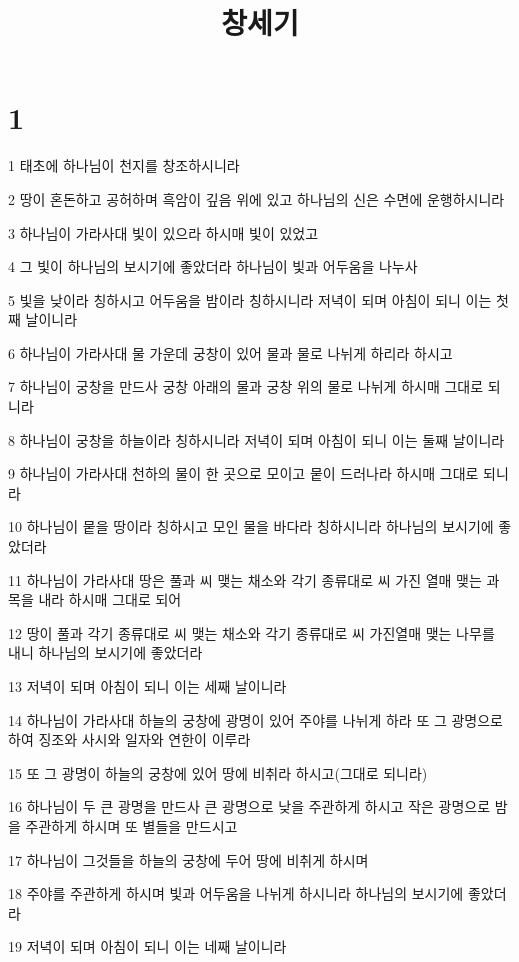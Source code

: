 

\title{창세기}


\chapter{1}

\par 1 태초에 하나님이 천지를 창조하시니라
\par 2 땅이 혼돈하고 공허하며 흑암이 깊음 위에 있고 하나님의 신은 수면에 운행하시니라
\par 3 하나님이 가라사대 빛이 있으라 하시매 빛이 있었고
\par 4 그 빛이 하나님의 보시기에 좋았더라 하나님이 빛과 어두움을 나누사
\par 5 빛을 낮이라 칭하시고 어두움을 밤이라 칭하시니라 저녁이 되며 아침이 되니 이는 첫째 날이니라
\par 6 하나님이 가라사대 물 가운데 궁창이 있어 물과 물로 나뉘게 하리라 하시고
\par 7 하나님이 궁창을 만드사 궁창 아래의 물과 궁창 위의 물로 나뉘게 하시매 그대로 되니라
\par 8 하나님이 궁창을 하늘이라 칭하시니라 저녁이 되며 아침이 되니 이는 둘째 날이니라
\par 9 하나님이 가라사대 천하의 물이 한 곳으로 모이고 뭍이 드러나라 하시매 그대로 되니라
\par 10 하나님이 뭍을 땅이라 칭하시고 모인 물을 바다라 칭하시니라 하나님의 보시기에 좋았더라
\par 11 하나님이 가라사대 땅은 풀과 씨 맺는 채소와 각기 종류대로 씨 가진 열매 맺는 과목을 내라 하시매 그대로 되어
\par 12 땅이 풀과 각기 종류대로 씨 맺는 채소와 각기 종류대로 씨 가진열매 맺는 나무를 내니 하나님의 보시기에 좋았더라
\par 13 저녁이 되며 아침이 되니 이는 세째 날이니라
\par 14 하나님이 가라사대 하늘의 궁창에 광명이 있어 주야를 나뉘게 하라 또 그 광명으로 하여 징조와 사시와 일자와 연한이 이루라
\par 15 또 그 광명이 하늘의 궁창에 있어 땅에 비취라 하시고(그대로 되니라)
\par 16 하나님이 두 큰 광명을 만드사 큰 광명으로 낮을 주관하게 하시고 작은 광명으로 밤을 주관하게 하시며 또 별들을 만드시고
\par 17 하나님이 그것들을 하늘의 궁창에 두어 땅에 비취게 하시며
\par 18 주야를 주관하게 하시며 빛과 어두움을 나뉘게 하시니라 하나님의 보시기에 좋았더라
\par 19 저녁이 되며 아침이 되니 이는 네째 날이니라
